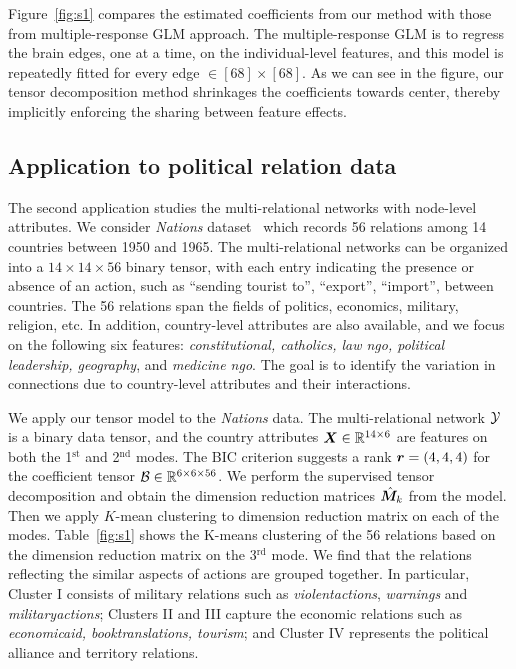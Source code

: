 \documentclass[12pt]{article}
\theoremstyle{definition}
\theoremstyle{definition}
\begin{document}


Figure~\ref{fig:s1} compares the estimated coefficients from our method with those from multiple-response GLM approach. The multiple-response GLM is to regress the brain edges, one at a time, on the individual-level features, and this model is repeatedly fitted for every edge $\in [68]\times [68]$. As we can see in the figure, our tensor decomposition method shrinkages the coefficients towards center, thereby implicitly enforcing the sharing between feature effects. 



\subsection{Application to political relation data}

The second application studies the multi-relational networks with node-level attributes. We consider \emph{Nations} dataset~\citep{nickel2011three} which records 56 relations among 14 countries between 1950 and 1965. The multi-relational networks can be organized into a $14 \times 14 \times 56$ binary tensor, with each entry indicating the presence or absence of an action, such as ``sending tourist to'', ``export'', ``import'', between countries. The 56 relations span the fields of politics, economics, military, religion, etc. In addition, country-level attributes are also available, and we focus on the following six features: \emph{constitutional, catholics, law ngo, political leadership, geography}, and \emph{medicine ngo}. The goal is to identify the variation in connections due to country-level attributes and their interactions. 

We apply our tensor model to the \emph{Nations} data. The multi-relational network $\mathcal{Y}$ is a binary data tensor, and the country attributes $\bm X\in\mathbb{R}^{14\times 6}$ are features on both the 1$^\text{st}$ and 2$^\text{nd}$ modes. The BIC criterion suggests a rank $\bm{r}=(4,4,4)$ for the coefficient tensor $\mathcal{B}\in\mathbb{R}^{6\times 6 \times 56}$. 
We perform the supervised tensor decomposition and obtain the dimension reduction matrices $\hat {\bm M}_k$ from the model. Then we apply $K$-mean clustering to dimension reduction matrix on each of the modes. Table~\ref{fig:s1} shows the K-means clustering of the 56 relations based on the dimension reduction matrix on the 3$^\text{rd}$ mode. We find that the relations reflecting the similar aspects of actions are grouped together. In particular, Cluster I consists of military relations such as \emph{violentactions}, \emph{warnings} and \emph{militaryactions}; Clusters II and III capture the economic relations such as \emph{economicaid, booktranslations, tourism}; and Cluster IV represents the political alliance and territory relations. 
\end{document}
